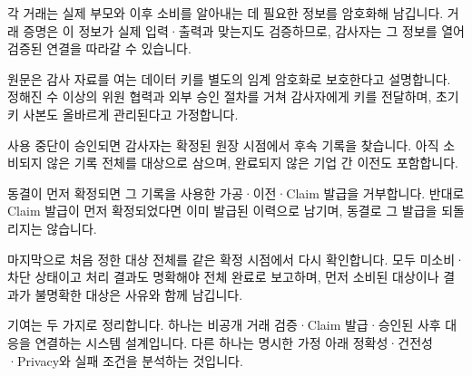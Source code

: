 각 거래는 실제 부모와 이후 소비를 알아내는 데 필요한 정보를 암호화해 남깁니다.
거래 증명은 이 정보가 실제 입력·출력과 맞는지도 검증하므로, 감사자는 그 정보를 열어 검증된 연결을 따라갈 수 있습니다.

원문은 감사 자료를 여는 데이터 키를 별도의 임계 암호화로 보호한다고 설명합니다.
정해진 수 이상의 위원 협력과 외부 승인 절차를 거쳐 감사자에게 키를 전달하며, 초기 키 사본도 올바르게 관리된다고 가정합니다.

사용 중단이 승인되면 감사자는 확정된 원장 시점에서 후속 기록을 찾습니다.
아직 소비되지 않은 기록 전체를 대상으로 삼으며, 완료되지 않은 기업 간 이전도 포함합니다.

동결이 먼저 확정되면 그 기록을 사용한 가공·이전·Claim 발급을 거부합니다.
반대로 Claim 발급이 먼저 확정되었다면 이미 발급된 이력으로 남기며, 동결로 그 발급을 되돌리지는 않습니다.

마지막으로 처음 정한 대상 전체를 같은 확정 시점에서 다시 확인합니다.
모두 미소비·차단 상태이고 처리 결과도 명확해야 전체 완료로 보고하며, 먼저 소비된 대상이나 결과가 불명확한 대상은 사유와 함께 남깁니다.

기여는 두 가지로 정리합니다.
하나는 비공개 거래 검증·Claim 발급·승인된 사후 대응을 연결하는 시스템 설계입니다.
다른 하나는 명시한 가정 아래 정확성·건전성·Privacy와 실패 조건을 분석하는 것입니다.
